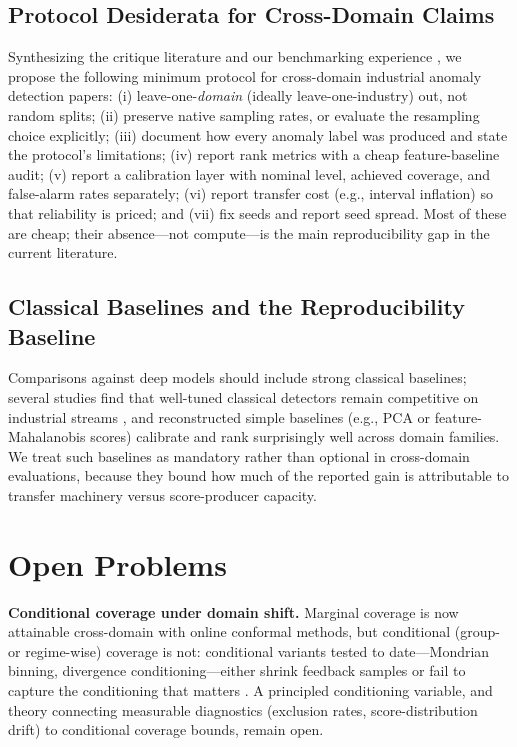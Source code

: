 \subsection{Protocol Desiderata for Cross-Domain Claims}
Synthesizing the critique literature \cite{2109_05257,2409_13053,2511_18739,2405_12096} and our benchmarking experience \cite{our_scc}, we propose the following minimum protocol for cross-domain industrial anomaly detection papers: (i) leave-one-\emph{domain} (ideally leave-one-industry) out, not random splits; (ii) preserve native sampling rates, or evaluate the resampling choice explicitly; (iii) document how every anomaly label was produced and state the protocol's limitations; (iv) report rank metrics with a cheap feature-baseline audit; (v) report a calibration layer with nominal level, achieved coverage, and false-alarm rates separately; (vi) report transfer cost (e.g., interval inflation) so that reliability is priced; and (vii) fix seeds and report seed spread. Most of these are cheap; their absence---not compute---is the main reproducibility gap in the current literature.

\subsection{Classical Baselines and the Reproducibility Baseline}
Comparisons against deep models should include strong classical baselines; several studies find that well-tuned classical detectors remain competitive on industrial streams \cite{2204_01637,2212_11080}, and reconstructed simple baselines (e.g., PCA or feature-Mahalanobis scores) calibrate and rank surprisingly well across domain families. We treat such baselines as mandatory rather than optional in cross-domain evaluations, because they bound how much of the reported gain is attributable to transfer machinery versus score-producer capacity.

\section{Open Problems}
\label{sec:open}

\textbf{Conditional coverage under domain shift.} Marginal coverage is now attainable cross-domain with online conformal methods, but conditional (group- or regime-wise) coverage is not: conditional variants tested to date---Mondrian binning, divergence conditioning---either shrink feedback samples or fail to capture the conditioning that matters \cite{2502_09443,2609_33868}. A principled conditioning variable, and theory connecting measurable diagnostics (exclusion rates, score-distribution drift) to conditional coverage bounds, remain open.

